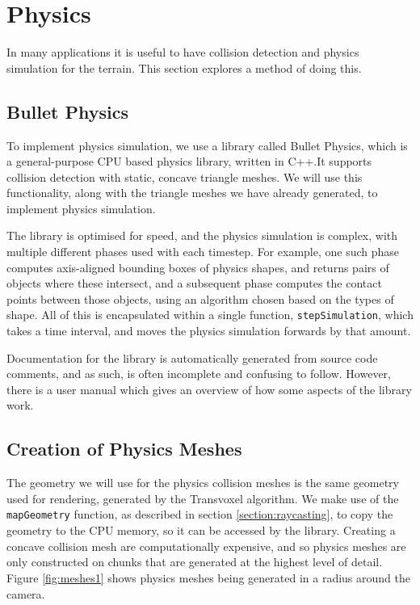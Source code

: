 \documentclass[11pt]{article}
\begin{document}
\section{Physics}
In many applications it is useful to have collision detection and physics simulation for the terrain. This section explores a method of doing this.
\subsection{Bullet Physics}
To implement physics simulation, we use a library called Bullet Physics\cite{bullet-physics}, which is a general-purpose CPU based physics library, written in C++.It supports collision detection with static, concave triangle meshes. We will use this functionality, along with the triangle meshes we have already generated, to implement physics simulation.

The library is optimised for speed, and the physics simulation is complex, with multiple different phases used with each timestep. For example, one such phase computes axis-aligned bounding boxes of physics shapes, and returns pairs of objects where these intersect, and a subsequent phase computes the contact points between those objects, using an algorithm chosen based on the types of shape. All of this is encapsulated within a single function, \texttt{stepSimulation}, which takes a time interval, and moves the physics simulation forwards by that amount.

Documentation for the library is automatically generated from source code comments, and as such, is often incomplete and confusing to follow. However, there is a user manual which gives an overview of how some aspects of the library work\cite{coumans_2015}.

\subsection{Creation of Physics Meshes}

The geometry we will use for the physics collision meshes is the same geometry used for rendering, generated by the Transvoxel algorithm. We make use of the \texttt{mapGeometry} function, as described in section \ref{section:raycasting}, to copy the geometry to the CPU memory, so it can be accessed by the library.
Creating a concave collision mesh are computationally expensive, and so physics meshes are only constructed on chunks that are generated at the highest level of detail. Figure \ref{fig:meshes1} shows physics meshes being generated in a radius around the camera.
\end{document}
